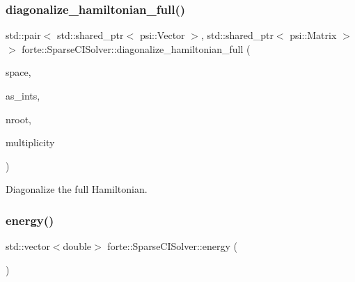 \mbox{\label{classforte_1_1_sparse_c_i_solver_a0914242905e0c2483757b4b8ff213c41}} 
\subsubsection{\texorpdfstring{diagonalize\+\_\+hamiltonian\+\_\+full()}{diagonalize\_hamiltonian\_full()}}
{\footnotesize\ttfamily std\+::pair$<$ std\+::shared\+\_\+ptr$<$ psi\+::\+Vector $>$, std\+::shared\+\_\+ptr$<$ psi\+::\+Matrix $>$ $>$ forte\+::\+Sparse\+C\+I\+Solver\+::diagonalize\+\_\+hamiltonian\+\_\+full (\begin{DoxyParamCaption}\item[{const std\+::vector$<$ \mbox{\hyperlink{namespaceforte_a2076c63fd7b8732004d9e1442ce527c1}{Determinant}} $>$ \&}]{space,  }\item[{std\+::shared\+\_\+ptr$<$ \mbox{\hyperlink{classforte_1_1_active_space_integrals}{Active\+Space\+Integrals}} $>$}]{as\+\_\+ints,  }\item[{int}]{nroot,  }\item[{int}]{multiplicity }\end{DoxyParamCaption})}



Diagonalize the full Hamiltonian. 

\mbox{\label{classforte_1_1_sparse_c_i_solver_af6b2886d5631f37463a8e9e903f19d40}} 
\subsubsection{\texorpdfstring{energy()}{energy()}}
{\footnotesize\ttfamily std\+::vector$<$double$>$ forte\+::\+Sparse\+C\+I\+Solver\+::energy (\begin{DoxyParamCaption}{ }\end{DoxyParamCaption})\hspace{0.3cm}{\ttfamily [inline]}}

